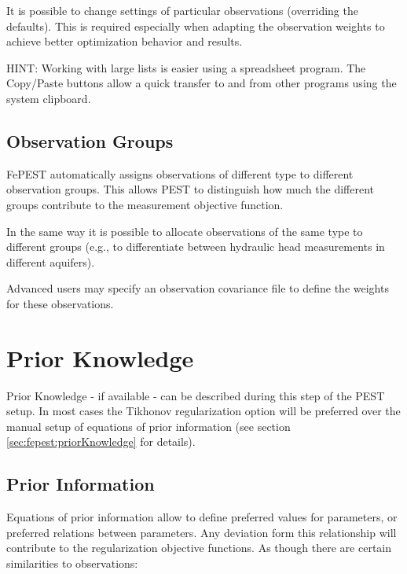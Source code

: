 It is possible to change settings of particular observations (overriding the defaults). This is required especially when adapting the observation weights to achieve better optimization behavior and results.
 
HINT: Working with large lists is easier using a spreadsheet program. The Copy/Paste buttons allow a quick transfer to and from other programs using the system clipboard.

\subsection{Observation Groups}

FePEST automatically assigns observations of different type to different observation groups. This allows PEST to distinguish how much the different groups contribute to the measurement objective function.

In the same way it is possible to allocate observations of the same type to different groups (e.g., to differentiate between hydraulic head measurements in different aquifers). 

Advanced users may specify an observation covariance file to define the weights for these observations.

\section{Prior Knowledge}

Prior Knowledge - if available - can be described during this step of the PEST setup. In most cases the Tikhonov regularization option will be preferred over the manual setup of equations of prior information (see section \ref{sec:fepest:priorKnowledge} for details).

\subsection{Prior Information}

Equations of prior information allow to define preferred values for parameters, or preferred relations between parameters. Any deviation form this relationship will contribute to the regularization objective functions. As though there are certain similarities to observations:

